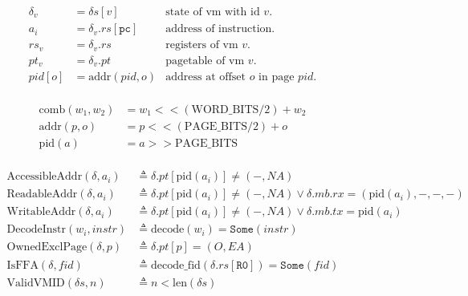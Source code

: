 \documentclass[a4paper]{article}
\newcommand*{\defined}{\triangleq}
\newcommand*{\PPBITS}{\text{PAGE\_BITS}}
\newcommand*{\PWBITS}{\text{WORD\_BITS}}
\newcommand*{\DN}[1]{\mathtt{Done} \; {#1}}
\newcommand*{\NXT}[1]{\mathtt{Next} \; {#1}}
\newcommand*{\decode}{\text{decode}}
\newcommand*{\pid}{\text{pid}}
\newcommand{\SOME}{\mathtt{Some}}
\begin{document}
\newcommand{\reg}[1]{\texttt{{#1}}}
\newcommand{\ta}[1]{\text{to\_addr}({#1})}
\newcommand{\tw}[1]{\text{to\_word}({#1})}
\newcommand{\tv}[1]{\text{to\_vmid}({#1})}
\newcommand{\DNNXT}[1]{\DN{\NXT{ {#1} }}}
\begin{figure}[!htb]
    \begin{align*}
      \delta_v&=\delta s[v] & \text{state of vm with id }v.\\
      a_i&=\delta_v.rs[\mathtt{pc}] & \text{address of instruction}. \\
      rs_v&=\delta_v.rs & \text{registers of vm }v.\\
      pt_{v}&=\delta_v.pt & \text{pagetable of vm }v.\\
      pid[o] &=\text{addr}(pid,o) & \text{address at offset }o \text{ in page }pid.
    \end{align*}
    \\
    \begin{align*}
          \text{comb}(w_{1},w_{2})&=w_{1}<<(\PWBITS/2)+w_{2}\\
    \text{addr}(p,o)&=p<<(\PPBITS/2)+o \\
    \pid(a) &= a >> \PPBITS
      \end{align*}
    \\
    \begin{align*}
      \text{AccessibleAddr}(\delta,a_i) &\defined \delta.pt[\pid(a_i)]\ne(-,NA) \\
      \text{ReadableAddr}(\delta,a_i) &\defined \delta.pt[\pid(a_i)]\ne(-,NA) \lor \delta.mb.rx=(\pid(a_i),-,-,-) \\
      \text{WritableAddr}(\delta,a_i) &\defined \delta.pt[\pid(a_i)]\ne(-,NA) \lor \delta.mb.tx=\pid(a_i) \\
      \text{DecodeInstr}(w_i,instr) &\defined \decode(w_i)=\SOME(instr)\\
      \text{OwnedExclPage}(\delta,p) & \defined \delta.pt[p]=(O,EA)\\
      \text{IsFFA}(\delta, fid) & \defined \text{decode\_fid}(\delta.rs[\reg{R0}])=\SOME(fid)\\
      \text{ValidVMID}(\delta s,n) &\defined n<\text{len}(\delta s)
    \end{align*}


\end{figure}
\end{document}
